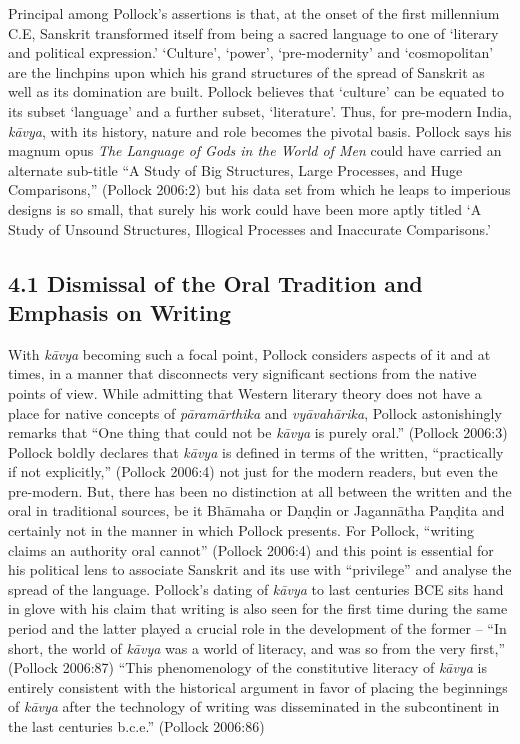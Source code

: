 Principal among Pollock’s assertions is that, at the onset of the first millennium C.E, Sanskrit transformed itself from being a sacred language to one of ‘literary and political expression.’ ‘Culture’, ‘power’, ‘pre-modernity’ and ‘cosmopolitan’ are the linchpins upon which his grand structures of the spread of Sanskrit as well as its domination are built. Pollock believes that ‘culture’ can be equated to its subset ‘language’ and a further subset, ‘literature’. Thus, for pre-modern India, \textit{kāvya}, with its history, nature and role becomes the pivotal basis. Pollock says his magnum opus \textit{The Language of Gods in the World of Men} could have carried an alternate sub-title “A Study of Big Structures, Large Processes, and Huge Comparisons,” (Pollock 2006:2) but his data set from which he leaps to imperious designs is so small, that surely his work could have been more aptly titled ‘A Study of Unsound Structures, Illogical Processes and Inaccurate Comparisons.’

\subsection*{4.1 Dismissal of the Oral Tradition and Emphasis on Writing}

With \textit{kāvya} becoming such a focal point, Pollock considers aspects of it and at times, in a manner that disconnects very significant sections from the native points of view. While admitting that Western literary theory does not have a place for native concepts of \textit{pāramārthika} and \textit{vyāvahārika}, Pollock astonishingly remarks that “One thing that could not be \textit{kāvya} is purely oral.” (Pollock 2006:3) Pollock boldly declares that \textit{kāvya} is defined in terms of the written, “practically if not explicitly,” (Pollock 2006:4) not just for the modern readers, but even the pre-modern. But, there has been no distinction at all between the written and the oral in traditional sources, be it Bhāmaha or Daṇḍin or Jagannātha Paṇḍita and certainly not in the manner in which Pollock presents. For Pollock, “writing claims an authority oral cannot” (Pollock 2006:4) and this point is essential for his political lens to associate Sanskrit and its use with “privilege” and analyse the spread of the language. Pollock’s dating of \textit{kāvya} to last centuries BCE sits hand in glove with his claim that writing is also seen for the first time during the same period and the latter played a crucial role in the development of the former – “In short, the world of \textit{kāvya} was a world of literacy, and was so from the very first,” (Pollock 2006:87) “This phenomenology of the constitutive literacy of \textit{kāvya} is entirely consistent with the historical argument in favor of placing the beginnings of \textit{kāvya} after the technology of writing was disseminated in the subcontinent in the last centuries b.c.e.” (Pollock 2006:86)

